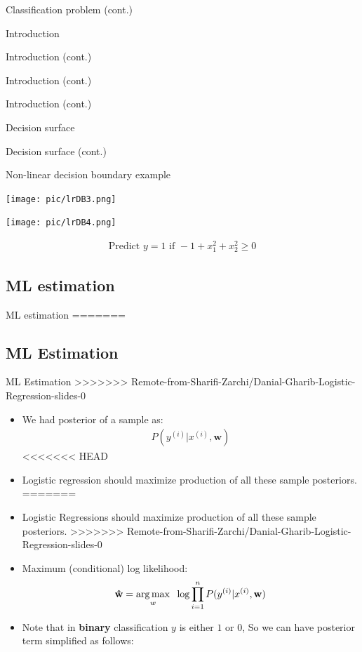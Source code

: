 \documentclass[serif, aspectratio=169]{beamer}
\begin{document}
\begin{frame}{Classification problem (cont.)}
\begin{itemize}
\begin{frame}{Introduction}
\begin{itemize}
\begin{frame}{Introduction (cont.)}
\begin{frame}{Introduction (cont.)}
\begin{frame}{Introduction (cont.)}
\begin{frame}{Decision surface}
\begin{itemize}
\begin{frame}{Decision surface (cont.)}
\begin{frame}{Non-linear decision boundary example}
    \begin{minipage}{0.30\linewidth}
        \centering
        \texttt{[image: pic/lrDB3.png]}
    \end{minipage}
    \hfill
    \begin{minipage}{0.30\linewidth}
        \centering
        \texttt{[image: pic/lrDB4.png]}
    \end{minipage}
    
    \begin{align*}
        \text{Predict } y=1 \text{ if } -1 + x_1^2 + x_2^2 \geq 0
    \end{align*}
    
\end{frame}
\subsection{ML estimation}

\begin{frame}{ML estimation}
=======

\subsection{ML Estimation}

\begin{frame}{ML Estimation}
>>>>>>> Remote-from-Sharifi-Zarchi/Danial-Gharib-Logistic-Regression-slides-0
    \begin{itemize}
        \item We had posterior of a sample as:
        \begin{align*}
            P(y^{(i)}|x^{(i)},\mathbf{w})
        \end{align*}
<<<<<<< HEAD
        \item Logistic regression should maximize production of all these sample posteriors.
=======
        \item Logistic Regressions should maximize production of all these sample posteriors.
>>>>>>> Remote-from-Sharifi-Zarchi/Danial-Gharib-Logistic-Regression-slides-0
        
        \item Maximum (conditional) log likelihood:
        \begin{align*}
             \mathbf{\hat{w}} = \underset{w}{\arg\max} \hspace{0.2cm} \log \prod_{i=1}^{n} P(y^{(i)}|x^{(i)},\mathbf{w})
        \end{align*}
        \item Note that in \textbf{binary} classification $y$ is either $1$ or $0$, So we can have posterior term simplified as follows:
        

\end{itemize}
\end{frame}
\end{frame}
\end{frame}
\end{itemize}
\end{frame}
\end{frame}
\end{frame}
\end{frame}
\end{itemize}
\end{frame}
\end{itemize}
\end{frame}
\end{document}
